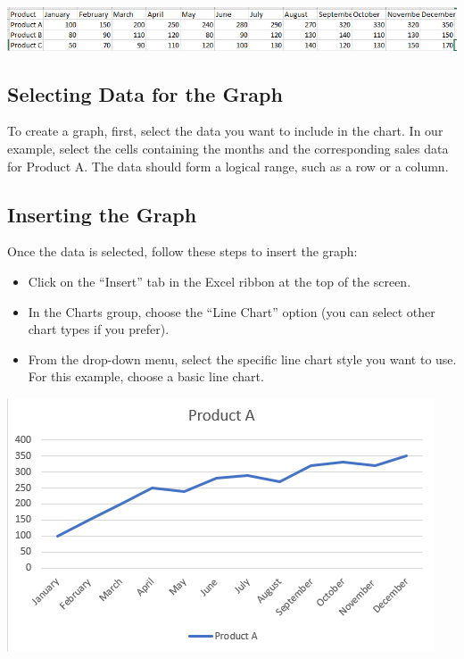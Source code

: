 \documentclass[
]{book}
\providecommand{\tightlist}{%
  \setlength{\itemsep}{0pt}\setlength{\parskip}{0pt}}
\begin{document}
\includegraphics{GraphPic1.png}

\hypertarget{selecting-data-for-the-graph}{%
\subsection{Selecting Data for the Graph}\label{selecting-data-for-the-graph}}

To create a graph, first, select the data you want to include in the chart. In our example, select the cells containing the months and the corresponding sales data for Product A. The data should form a logical range, such as a row or a column.

\hypertarget{inserting-the-graph}{%
\subsection{Inserting the Graph}\label{inserting-the-graph}}

Once the data is selected, follow these steps to insert the graph:

\begin{itemize}
\tightlist
\item
  Click on the ``Insert'' tab in the Excel ribbon at the top of the screen.
\item
  In the Charts group, choose the ``Line Chart'' option (you can select other chart types if you prefer).
\item
  From the drop-down menu, select the specific line chart style you want to use. For this example, choose a basic line chart.
\end{itemize}

\includegraphics{GraphPic2.png}
\end{document}
